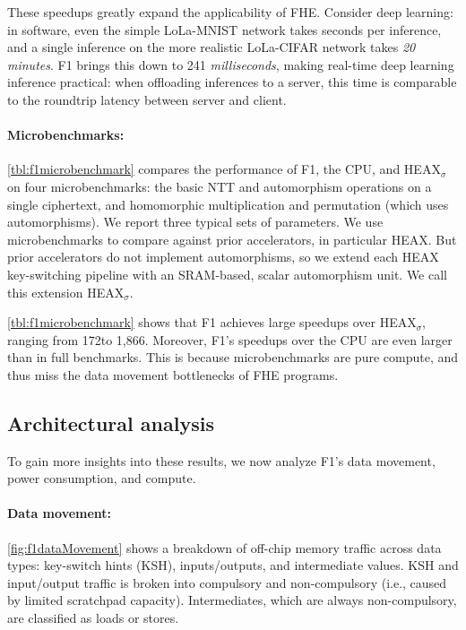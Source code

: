 These speedups greatly expand the applicability of FHE. Consider deep learning:
in software, even the simple LoLa-MNIST network takes seconds per inference,
and a single inference on the more realistic LoLa-CIFAR network takes \emph{20 minutes}.
F1 brings this down to 241 \emph{milliseconds},
making real-time deep learning inference practical:
when offloading inferences to a server, this time is comparable
to the roundtrip latency between server and client.

\paragraph{Microbenchmarks:}
\autoref{tbl:f1microbenchmark} compares the performance of F1, the CPU, and HEAX$_\sigma$ on four microbenchmarks:
the basic NTT and automorphism operations on a single ciphertext,
and homomorphic multiplication and permutation (which uses automorphisms).
We report three typical sets of parameters.
We use microbenchmarks to compare against prior accelerators,
in particular HEAX.
But prior accelerators do not implement automorphisms,
so we extend each HEAX key-switching pipeline with an SRAM-based, scalar automorphism unit.
We call this extension HEAX$_\sigma$.

\autoref{tbl:f1microbenchmark} shows that
F1 achieves large speedups over HEAX$_\sigma$,
ranging from 172\x to 1,866\x.
Moreover, F1's speedups over the CPU are even larger than in full benchmarks.
This is because microbenchmarks are pure compute,
and thus miss the data movement bottlenecks of FHE programs.

\subsection{Architectural analysis}

To gain more insights into these results, we now analyze F1's data movement, power consumption, and compute.

\paragraph{Data movement:}
\autoref{fig:f1dataMovement} shows a breakdown of off-chip memory traffic across data types:
key-switch hints (KSH), inputs/outputs, and intermediate values.
KSH and input/output traffic is broken into compulsory and
non-compulsory (i.e., caused by limited scratchpad capacity).
Intermediates, which are always non-compulsory, are classified as loads or stores.

